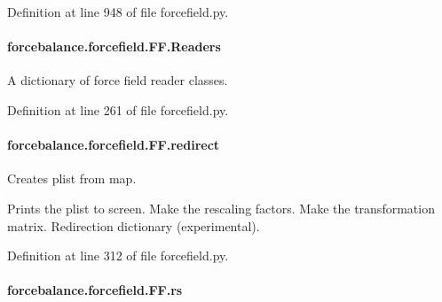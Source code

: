 Definition at line 948 of file forcefield.\-py.

\hypertarget{classforcebalance_1_1forcefield_1_1FF_a9db381836dba8b531ff7d45dce877f4f}{
\paragraph[{Readers}]{\setlength{\rightskip}{0pt plus 5cm}forcebalance.\-forcefield.\-F\-F.\-Readers}}\label{classforcebalance_1_1forcefield_1_1FF_a9db381836dba8b531ff7d45dce877f4f}


A dictionary of force field reader classes. 



Definition at line 261 of file forcefield.\-py.

\hypertarget{classforcebalance_1_1forcefield_1_1FF_ada9b82220eb6e6335a36617dd5746695}{
\paragraph[{redirect}]{\setlength{\rightskip}{0pt plus 5cm}forcebalance.\-forcefield.\-F\-F.\-redirect}}\label{classforcebalance_1_1forcefield_1_1FF_ada9b82220eb6e6335a36617dd5746695}


Creates plist from map. 

Prints the plist to screen. Make the rescaling factors. Make the transformation matrix. Redirection dictionary (experimental). 

Definition at line 312 of file forcefield.\-py.

\hypertarget{classforcebalance_1_1forcefield_1_1FF_acf33c8285b56b92510b5572448c3358e}{
\paragraph[{rs}]{\setlength{\rightskip}{0pt plus 5cm}forcebalance.\-forcefield.\-F\-F.\-rs}}\label{classforcebalance_1_1forcefield_1_1FF_acf33c8285b56b92510b5572448c3358e}



